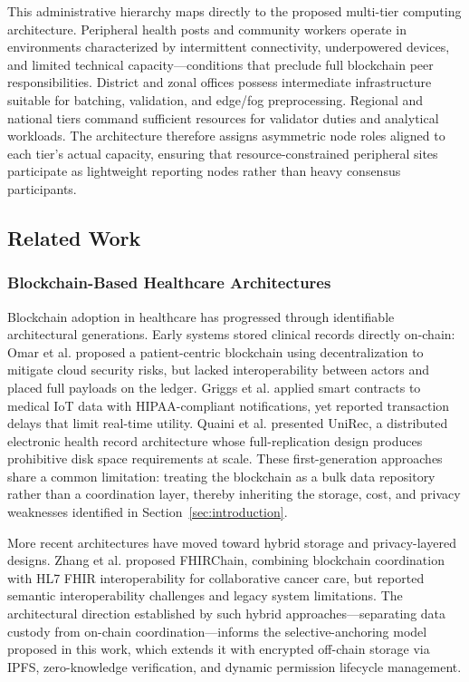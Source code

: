 This administrative hierarchy maps directly to the proposed multi-tier computing architecture. Peripheral health posts and community workers operate in environments characterized by intermittent connectivity, underpowered devices, and limited technical capacity---conditions that preclude full blockchain peer responsibilities. District and zonal offices possess intermediate infrastructure suitable for batching, validation, and edge/fog preprocessing. Regional and national tiers command sufficient resources for validator duties and analytical workloads. The architecture therefore assigns asymmetric node roles aligned to each tier's actual capacity, ensuring that resource-constrained peripheral sites participate as lightweight reporting nodes rather than heavy consensus participants.

\subsection{Related Work}\label{subsec:related}

\subsubsection{Blockchain-Based Healthcare Architectures}

Blockchain adoption in healthcare has progressed through identifiable architectural generations. Early systems stored clinical records directly on-chain: Omar et al.\cite{omar2019privacy} proposed a patient-centric blockchain using decentralization to mitigate cloud security risks, but lacked interoperability between actors and placed full payloads on the ledger. Griggs et al.\cite{griggs2018healthcare} applied smart contracts to medical IoT data with HIPAA-compliant notifications, yet reported transaction delays that limit real-time utility. Quaini et al.\cite{quaini2018model} presented UniRec, a distributed electronic health record architecture whose full-replication design produces prohibitive disk space requirements at scale. These first-generation approaches share a common limitation: treating the blockchain as a bulk data repository rather than a coordination layer, thereby inheriting the storage, cost, and privacy weaknesses identified in Section~\ref{sec:introduction}.

More recent architectures have moved toward hybrid storage and privacy-layered designs. Zhang et al.\cite{zhang2018fhirchain} proposed FHIRChain, combining blockchain coordination with HL7 FHIR interoperability for collaborative cancer care, but reported semantic interoperability challenges and legacy system limitations. The architectural direction established by such hybrid approaches---separating data custody from on-chain coordination---informs the selective-anchoring model proposed in this work, which extends it with encrypted off-chain storage via IPFS, zero-knowledge verification, and dynamic permission lifecycle management.

